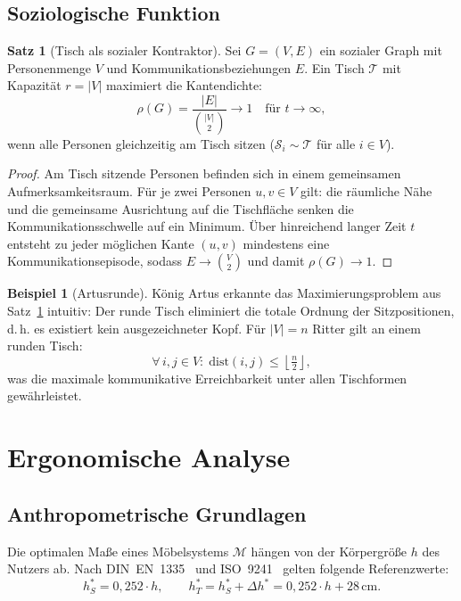 \documentclass[a4paper,12pt]{article}
\theoremstyle{definition}
\newtheorem{beispiel}{Beispiel}
\newtheorem{satz}{Satz}
\begin{document}
\subsection{Soziologische Funktion}

\begin{satz}[Tisch als sozialer Kontraktor]
\label{satz:sozial}
	Sei $G = (V, E)$ ein sozialer Graph mit Personenmenge $V$ und Kommunikationsbeziehungen
	$E$. Ein Tisch $\mathcal{T}$ mit Kapazit\"{a}t $r = |V|$ maximiert die Kantendichte:
	\[
		\rho(G) = \frac{|E|}{\binom{|V|}{2}} \to 1 \quad \text{f\"{u}r } t \to \infty,
	\]
	wenn alle Personen gleichzeitig am Tisch sitzen ($\mathcal{S}_i \sim \mathcal{T}$
	f\"{u}r alle $i \in V$).
\end{satz}

\begin{proof}
	Am Tisch sitzende Personen befinden sich in einem gemeinsamen Aufmerksamkeitsraum.
	F\"{u}r je zwei Personen $u, v \in V$ gilt: die r\"{a}umliche N\"{a}he und die gemeinsame
	Ausrichtung auf die Tischfl\"{a}che senken die Kommunikationsschwelle auf ein Minimum.
	\"{U}ber hinreichend langer Zeit $t$ entsteht zu jeder m\"{o}glichen Kante $(u,v)$
	mindestens eine Kommunikationsepisode, sodass $E \to \binom{V}{2}$ und damit
	$\rho(G) \to 1$.
\end{proof}

\begin{beispiel}[Artusrunde]
	K\"{o}nig Artus erkannte das Maximierungsproblem aus Satz~\ref{satz:sozial} intuitiv:
	Der runde Tisch eliminiert die totale Ordnung der Sitzpositionen, d.\,h. es existiert
	kein ausgezeichneter Kopf. F\"{u}r $|V| = n$ Ritter gilt an einem runden Tisch:
	\[
		\forall\, i, j \in V\colon\; \mathrm{dist}(i, j) \leq \left\lfloor \tfrac{n}{2} \right\rfloor,
	\]
	was die maximale kommunikative Erreichbarkeit unter allen Tischformen gew\"{a}hrleistet.
\end{beispiel}

\section{Ergonomische Analyse}

\subsection{Anthropometrische Grundlagen}

Die optimalen Ma\ss{}e eines M\"{o}belsystems $\mathcal{M}$ h\"{a}ngen von der K\"{o}rpergr\"{o}\ss{}e $h$ des
Nutzers ab. Nach DIN~EN~1335~\cite{DINEN1335} und ISO~9241~\cite{ISO9241} gelten folgende Referenzwerte:
\[
	h_S^* = 0{,}252 \cdot h, \qquad
	h_T^* = h_S^* + \Delta h^* = 0{,}252 \cdot h + 28\,\mathrm{cm}.
\]
\end{document}
